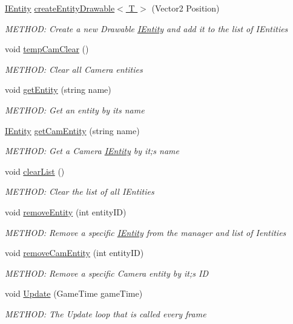 \begin{DoxyCompactItemize}
\hyperlink{a00438}{I\+Entity} \hyperlink{a00442_a36f4ce84282acb366896ebec20677cce}{create\+Entity\+Drawable$<$ T $>$} (Vector2 Position)
\begin{DoxyCompactList}\small\item\em M\+E\+T\+H\+OD\+: Create a new Drawable \hyperlink{a00438}{I\+Entity} and add it to the list of I\+Entities \end{DoxyCompactList}\item 
void \hyperlink{a00442_a04101871e7eef6b222a0cbd6225d0a7a}{temp\+Cam\+Clear} ()
\begin{DoxyCompactList}\small\item\em M\+E\+T\+H\+OD\+: Clear all Camera entities \end{DoxyCompactList}\item 
void \hyperlink{a00442_adff1edf326874f25e8a90bf45f020120}{get\+Entity} (string name)
\begin{DoxyCompactList}\small\item\em M\+E\+T\+H\+OD\+: Get an entity by it\textquotesingle{}s name \end{DoxyCompactList}\item 
\hyperlink{a00438}{I\+Entity} \hyperlink{a00442_aa1098871f43bbd775954aea10a958c0b}{get\+Cam\+Entity} (string name)
\begin{DoxyCompactList}\small\item\em M\+E\+T\+H\+OD\+: Get a Camera \hyperlink{a00438}{I\+Entity} by it;s name \end{DoxyCompactList}\item 
void \hyperlink{a00442_acccc889cc99843899ce0652a9959e907}{clear\+List} ()
\begin{DoxyCompactList}\small\item\em M\+E\+T\+H\+OD\+: Clear the list of all I\+Entities \end{DoxyCompactList}\item 
void \hyperlink{a00442_a13b425137cec67f2df4e65e8d08c531b}{remove\+Entity} (int entity\+ID)
\begin{DoxyCompactList}\small\item\em M\+E\+T\+H\+OD\+: Remove a specific \hyperlink{a00438}{I\+Entity} from the manager and list of Ientities \end{DoxyCompactList}\item 
void \hyperlink{a00442_aa341696fc31e28c71448cef613bf7f30}{remove\+Cam\+Entity} (int entity\+ID)
\begin{DoxyCompactList}\small\item\em M\+E\+T\+H\+OD\+: Remove a specific Camera entity by it;s ID \end{DoxyCompactList}\item 
void \hyperlink{a00442_a1b5aeaf8f2f6ad4a0c93aec1c331c1b2}{Update} (Game\+Time game\+Time)
\begin{DoxyCompactList}\small\item\em M\+E\+T\+H\+OD\+: The Update loop that is called every frame \end{DoxyCompactList}\end{DoxyCompactItemize}



